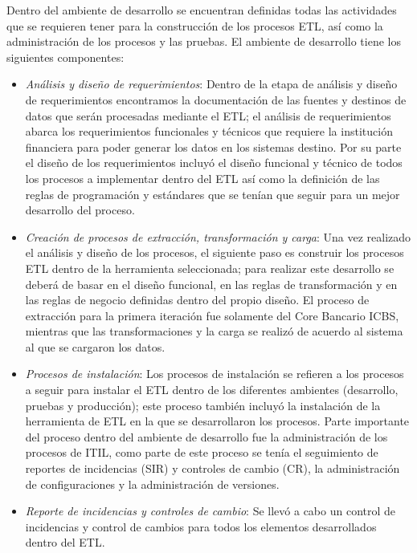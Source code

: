 Dentro del ambiente de desarrollo se encuentran definidas todas las actividades
que se requieren tener para la construcción de los procesos ETL, así como la
administración de los procesos y las pruebas. El ambiente de desarrollo tiene
los siguientes componentes:

\begin{itemize}

\item \textit{Análisis y diseño de requerimientos}: Dentro de la etapa de
  análisis y diseño de requerimientos encontramos la documentación de las
  fuentes y destinos de datos que serán procesadas mediante el ETL; el análisis
  de requerimientos abarca los requerimientos funcionales y técnicos que
  requiere la institución financiera para poder generar los datos en los
  sistemas destino.  Por su parte el diseño de los requerimientos incluyó el
  diseño funcional y técnico de todos los procesos a implementar dentro del ETL
  así como la definición de las reglas de programación y estándares que se
  tenían que seguir para un mejor desarrollo del proceso.

\item \textit{Creación de procesos de extracción, transformación y carga}: Una
  vez realizado el análisis y diseño de los procesos, el siguiente paso es
  construir los procesos ETL dentro de la herramienta seleccionada; para
  realizar este desarrollo se deberá de basar en el diseño funcional, en las
  reglas de transformación y en las reglas de negocio definidas dentro del
  propio diseño. El proceso de extracción para la primera iteración fue
  solamente del Core Bancario ICBS, mientras que las transformaciones y la carga
  se realizó de acuerdo al sistema al que se cargaron los datos.

\item \textit{Procesos de instalación}: Los procesos de instalación se refieren
  a los procesos a seguir para instalar el ETL dentro de los diferentes
  ambientes (desarrollo, pruebas y producción); este proceso también incluyó la
  instalación de la herramienta de ETL en la que se desarrollaron los procesos.
  Parte importante del proceso dentro del ambiente de desarrollo fue la
  administración de los procesos de ITIL, como parte de este proceso se tenía el
  seguimiento de reportes de incidencias (SIR) y controles de cambio (CR), la
  administración de configuraciones y la administración de versiones.

\item \textit{Reporte de incidencias y controles de cambio}: Se llevó a cabo un
  control de incidencias y control de cambios para todos los elementos
  desarrollados dentro del ETL.


\end{itemize}
